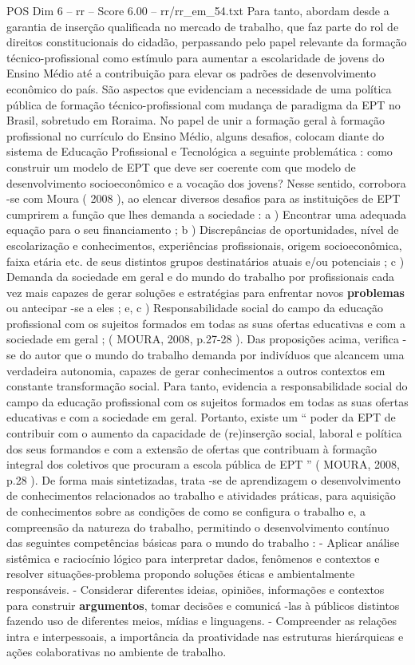 \begin{textsample}{POS Dim 6 – rr – Score 6.00 – rr/rr\_em\_54.txt}
Para tanto, abordam desde a garantia de inserção qualificada no mercado de trabalho, que faz parte do rol de direitos constitucionais do cidadão, perpassando pelo papel relevante da formação técnico-profissional como estímulo para aumentar a escolaridade de jovens do Ensino Médio até a contribuição para elevar os padrões de desenvolvimento econômico do país.
São aspectos que evidenciam a necessidade de uma política pública de formação técnico-profissional com mudança de paradigma da EPT no Brasil, sobretudo em Roraima.
No papel de unir a formação geral à formação profissional no currículo do Ensino Médio, alguns desafios, colocam diante do sistema de Educação Profissional e Tecnológica a seguinte problemática : como construir um modelo de EPT que deve ser coerente com que modelo de desenvolvimento socioeconômico e a vocação dos jovens?
Nesse sentido, corrobora -se com Moura ( 2008 ), ao elencar diversos desafios para as instituições de EPT cumprirem a função que lhes demanda a sociedade : a ) Encontrar uma adequada equação para o seu financiamento ; b ) Discrepâncias de oportunidades, nível de escolarização e conhecimentos, experiências profissionais, origem socioeconômica, faixa etária etc. de seus distintos grupos destinatários atuais e/ou potenciais ; c ) Demanda da sociedade em geral e do mundo do trabalho por profissionais cada vez mais capazes de gerar soluções e estratégias para enfrentar novos \textbf{problemas} ou antecipar -se a eles ; e, c ) Responsabilidade social do campo da educação profissional com os sujeitos formados em todas as suas ofertas educativas e com a sociedade em geral ; ( MOURA, 2008, p.27-28 ).
Das proposições acima, verifica -se do autor que o mundo do trabalho demanda por indivíduos que alcancem uma verdadeira autonomia, capazes de gerar conhecimentos a outros contextos em constante transformação social.
Para tanto, evidencia a responsabilidade social do campo da educação profissional com os sujeitos formados em todas as suas ofertas educativas e com a sociedade em geral.
Portanto, existe um “ poder da EPT de contribuir com o aumento da capacidade de (re)inserção social, laboral e política dos seus formandos e com a extensão de ofertas que contribuam à formação integral dos coletivos que procuram a escola pública de EPT ” ( MOURA, 2008, p.28 ).
De forma mais sintetizadas, trata -se de aprendizagem o desenvolvimento de conhecimentos relacionados ao trabalho e atividades práticas, para aquisição de conhecimentos sobre as condições de como se configura o trabalho e, a compreensão da natureza do trabalho, permitindo o desenvolvimento contínuo das seguintes competências básicas para o mundo do trabalho : - Aplicar análise sistêmica e raciocínio lógico para interpretar dados, fenômenos e contextos e resolver situações-problema propondo soluções éticas e ambientalmente responsáveis. - Considerar diferentes ideias, opiniões, informações e contextos para construir \textbf{argumentos}, tomar decisões e comunicá -las à públicos distintos fazendo uso de diferentes meios, mídias e linguagens. - Compreender as relações intra e interpessoais, a importância da proatividade nas estruturas hierárquicas e ações colaborativas no ambiente de trabalho.

\end{textsample}
